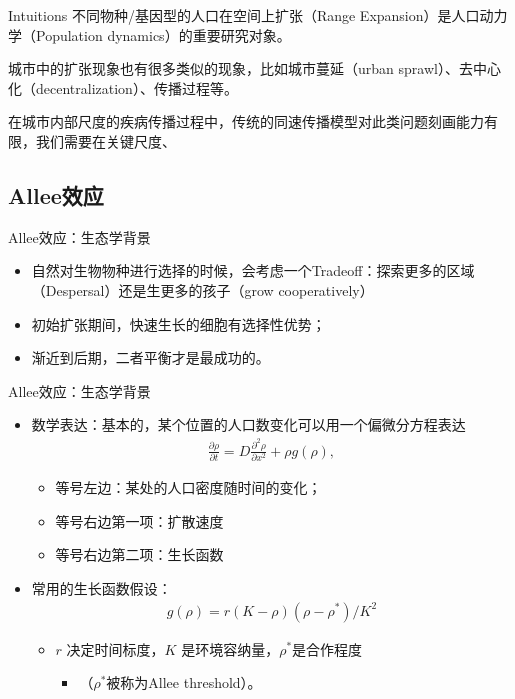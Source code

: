 \begin{frame}{Intuitions}
    不同物种/基因型的人口在空间上扩张（Range Expansion）是人口动力学（Population dynamics）的重要研究对象。
    
    \vspace{0.3cm}
    
    城市中的扩张现象也有很多类似的现象，比如城市蔓延（urban sprawl）、去中心化（decentralization）、传播过程等。
    
    \vspace{0.3cm}
    
    在城市内部尺度的疾病传播过程中，传统的同速传播模型对此类问题刻画能力有限，我们需要在关键尺度、
\end{frame}
\subsection{Allee效应}
\begin{frame}{Allee效应：生态学背景}
    \begin{itemize}
    \item 自然对生物物种进行选择的时候，会考虑一个Tradeoff：探索更多的区域（Despersal）还是生更多的孩子（grow cooperatively）
    \item 初始扩张期间，快速生长的细胞有选择性优势；
    \item 渐近到后期，二者平衡才是最成功的。
\end{itemize}
\end{frame}

\begin{frame}{Allee效应：生态学背景}
    \begin{itemize}
        \item 数学表达：基本的，某个位置的人口数变化可以用一个偏微分方程表达\begin{align}
            \frac{\partial \rho}{\partial t}=D \frac{\partial^{2} \rho}{\partial x^{2}}+ \rho g(\rho), 
        \end{align}
        \begin{itemize}
            \item 等号左边：某处的人口密度随时间的变化；
            \item 等号右边第一项：扩散速度
            \item 等号右边第二项：生长函数
        \end{itemize}
        \pause
        \item 常用的生长函数假设：\begin{align}
            g(\rho)=r(K-\rho)\left(\rho-\rho^{*}\right) / K^{2}
        \end{align}
        \begin{itemize}
            \item $r$ 决定时间标度，$K$ 是环境容纳量，\(\rho^*\)是合作程度
            \begin{itemize}
            \item（$\rho^*$被称为Allee threshold）。
            \end{itemize}
        \end{itemize}
    \end{itemize}
\end{frame}

